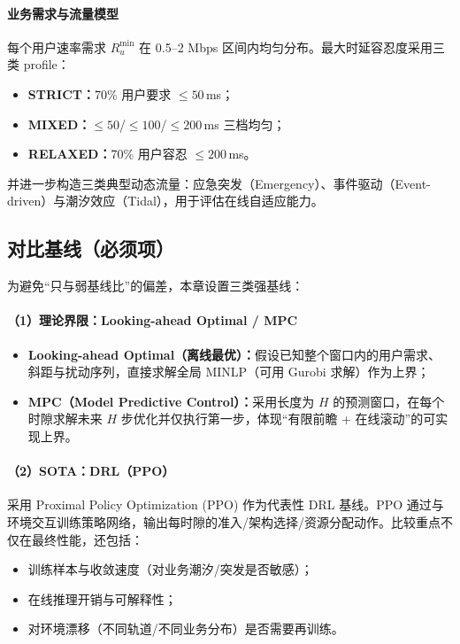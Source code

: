 \documentclass[type=master]{fduthesis}
\begin{document}
\paragraph{业务需求与流量模型}
每个用户速率需求 $R_u^{\min}$ 在 0.5--2 Mbps 区间内均匀分布。最大时延容忍度采用三类 profile：
\begin{itemize}
  \item \textbf{STRICT：}70\% 用户要求 $\le 50$\,ms；
  \item \textbf{MIXED：}$\le 50$/$\le 100$/$\le 200$\,ms 三档均匀；
  \item \textbf{RELAXED：}70\% 用户容忍 $\le 200$\,ms。
\end{itemize}
并进一步构造三类典型动态流量：应急突发（Emergency）、事件驱动（Event-driven）与潮汐效应（Tidal），用于评估在线自适应能力。

\subsection{对比基线（必须项）}
\label{subsec:ch3_baselines}

为避免“只与弱基线比”的偏差，本章设置三类强基线：

\paragraph{（1）理论界限：Looking-ahead Optimal / MPC}
\begin{itemize}
  \item \textbf{Looking-ahead Optimal（离线最优）：}假设已知整个窗口内的用户需求、斜距与扰动序列，直接求解全局 MINLP（可用 Gurobi 求解）作为上界；
  \item \textbf{MPC（Model Predictive Control）：}采用长度为 $H$ 的预测窗口，在每个时隙求解未来 $H$ 步优化并仅执行第一步，体现“有限前瞻 + 在线滚动”的可实现上界。
\end{itemize}

\paragraph{（2）SOTA：DRL（PPO）}
采用 Proximal Policy Optimization (PPO) 作为代表性 DRL 基线。PPO 通过与环境交互训练策略网络，输出每时隙的准入/架构选择/资源分配动作。比较重点不仅在最终性能，还包括：
\begin{itemize}
  \item 训练样本与收敛速度（对业务潮汐/突发是否敏感）；
  \item 在线推理开销与可解释性；
  \item 对环境漂移（不同轨道/不同业务分布）是否需要再训练。
\end{itemize}
\end{document}
